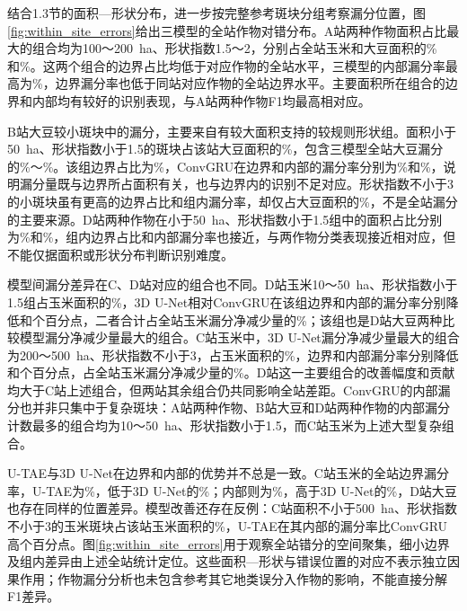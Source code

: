结合1.3节的面积—形状分布，进一步按完整参考斑块分组考察漏分位置，图\ref{fig:within_site_errors}给出三模型的全站作物对错分布。A站两种作物面积占比最大的组合均为100～200~ha、形状指数1.5～2，分别占全站玉米和大豆面积的\SACropCorn{}\%和\SACropSoy{}\%。这两个组合的边界占比均低于对应作物的全站水平，三模型的内部漏分率最高为\SAInteriorMax{}\%，边界漏分率也低于同站对应作物的全站边界水平。主要面积所在组合的边界和内部均有较好的识别表现，与A站两种作物F1均最高相对应。

B站大豆较小斑块中的漏分，主要来自有较大面积支持的较规则形状组。面积小于50~ha、形状指数小于1.5的斑块占该站大豆面积的\SBSmallArea{}\%，包含三模型全站大豆漏分的\SBSmallFnMin{}\%～\SBSmallFnMax{}\%。该组边界占比为\SBSmallBound{}\%，ConvGRU在边界和内部的漏分率分别为\SBSmallBoundaryFn{}\%和\SBSmallInteriorFn{}\%，说明漏分量既与边界所占面积有关，也与边界内的识别不足对应。形状指数不小于3的小斑块虽有更高的边界占比和组内漏分率，却仅占大豆面积的\SBComplexArea{}\%，不是全站漏分的主要来源。D站两种作物在小于50~ha、形状指数小于1.5组中的面积占比分别为\SDSmallCorn{}\%和\SDSmallSoy{}\%，组内边界占比和内部漏分率也接近，与两作物分类表现接近相对应，但不能仅据面积或形状分布判断识别难度。

模型间漏分差异在C、D站对应的组合也不同。D站玉米10～50~ha、形状指数小于1.5组占玉米面积的\SDMainArea{}\%，3D U-Net相对ConvGRU在该组边界和内部的漏分率分别降低\SDReductionBoundary{}和\SDReductionInterior{}个百分点，二者合计占全站玉米漏分净减少量的\SDNetShare{}\%；该组也是D站大豆两种比较模型漏分净减少量最大的组合。C站玉米中，3D U-Net漏分净减少量最大的组合为200～500~ha、形状指数不小于3，占玉米面积的\SCMainArea{}\%，边界和内部漏分率分别降低\SCReductionBoundary{}和\SCReductionInterior{}个百分点，占全站玉米漏分净减少量的\SCNetShare{}\%。D站这一主要组合的改善幅度和贡献均大于C站上述组合，但两站其余组合仍共同影响全站差距。ConvGRU的内部漏分也并非只集中于复杂斑块：A站两种作物、B站大豆和D站两种作物的内部漏分计数最多的组合均为10～50~ha、形状指数小于1.5，而C站玉米为上述大型复杂组合。

U-TAE与3D U-Net在边界和内部的优势并不总是一致。C站玉米的全站边界漏分率，U-TAE为\SCUtaeBoundary{}\%，低于3D U-Net的\SCUnetBoundary{}\%；内部则为\SCUtaeInterior{}\%，高于3D U-Net的\SCUnetInterior{}\%，D站大豆也存在同样的位置差异。模型改善还存在反例：C站面积不小于500~ha、形状指数不小于3的玉米斑块占该站玉米面积的\SCNegativeArea{}\%，U-TAE在其内部的漏分率比ConvGRU高\SCNegativePp{}个百分点。图\ref{fig:within_site_errors}用于观察全站错分的空间聚集，细小边界及组内差异由上述全站统计定位。这些面积—形状与错误位置的对应不表示独立因果作用；作物漏分分析也未包含参考其它地类误分入作物的影响，不能直接分解F1差异。

